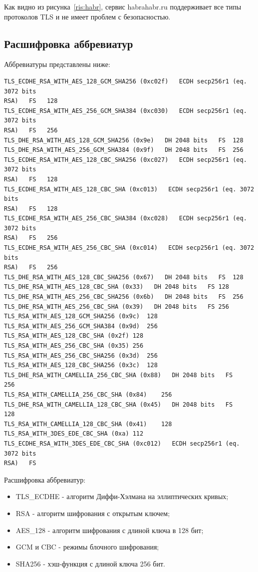 \documentclass[10pt,a4paper]{report}
\begin{document}
			Как видно из рисунка~\ref{ris:habr}, сервис habrahabr.ru поддерживает все 
			типы протоколов TLS и не имеет проблем с безопасностью.
			
		\subsection{Расшифровка аббревиатур}
			Аббревиатуры представлены ниже:
			\begin{lstlisting}
TLS_ECDHE_RSA_WITH_AES_128_GCM_SHA256 (0xc02f)   ECDH secp256r1 (eq. 3072 bits 
RSA)   FS	128
TLS_ECDHE_RSA_WITH_AES_256_GCM_SHA384 (0xc030)   ECDH secp256r1 (eq. 3072 bits 
RSA)   FS	256
TLS_DHE_RSA_WITH_AES_128_GCM_SHA256 (0x9e)   DH 2048 bits   FS	128
TLS_DHE_RSA_WITH_AES_256_GCM_SHA384 (0x9f)   DH 2048 bits   FS	256
TLS_ECDHE_RSA_WITH_AES_128_CBC_SHA256 (0xc027)   ECDH secp256r1 (eq. 3072 bits 
RSA)   FS	128
TLS_ECDHE_RSA_WITH_AES_128_CBC_SHA (0xc013)   ECDH secp256r1 (eq. 3072 bits 
RSA)   FS	128
TLS_ECDHE_RSA_WITH_AES_256_CBC_SHA384 (0xc028)   ECDH secp256r1 (eq. 3072 bits 
RSA)   FS	256
TLS_ECDHE_RSA_WITH_AES_256_CBC_SHA (0xc014)   ECDH secp256r1 (eq. 3072 bits 
RSA)   FS	256
TLS_DHE_RSA_WITH_AES_128_CBC_SHA256 (0x67)   DH 2048 bits   FS	128
TLS_DHE_RSA_WITH_AES_128_CBC_SHA (0x33)   DH 2048 bits   FS	128
TLS_DHE_RSA_WITH_AES_256_CBC_SHA256 (0x6b)   DH 2048 bits   FS	256
TLS_DHE_RSA_WITH_AES_256_CBC_SHA (0x39)   DH 2048 bits   FS	256
TLS_RSA_WITH_AES_128_GCM_SHA256 (0x9c)	128
TLS_RSA_WITH_AES_256_GCM_SHA384 (0x9d)	256
TLS_RSA_WITH_AES_128_CBC_SHA (0x2f)	128
TLS_RSA_WITH_AES_256_CBC_SHA (0x35)	256
TLS_RSA_WITH_AES_256_CBC_SHA256 (0x3d)	256
TLS_RSA_WITH_AES_128_CBC_SHA256 (0x3c)	128
TLS_DHE_RSA_WITH_CAMELLIA_256_CBC_SHA (0x88)   DH 2048 bits   FS	256
TLS_RSA_WITH_CAMELLIA_256_CBC_SHA (0x84)	256
TLS_DHE_RSA_WITH_CAMELLIA_128_CBC_SHA (0x45)   DH 2048 bits   FS	128
TLS_RSA_WITH_CAMELLIA_128_CBC_SHA (0x41)	128
TLS_RSA_WITH_3DES_EDE_CBC_SHA (0xa)	112
TLS_ECDHE_RSA_WITH_3DES_EDE_CBC_SHA (0xc012)   ECDH secp256r1 (eq. 3072 bits 
RSA)   FS
			\end{lstlisting}
			
			Расшифровка аббревиатур:
			\begin{itemize}
				\item TLS\_ECDHE - алгоритм Диффи-Хэлмана на эллиптических кривых;
				\item RSA - алгоритм шифрования с открытым ключем;
				\item AES\_128 - алгоритм шифрования с длиной ключа в 128 бит;
				\item GCM и CBC - режимы блочного шифрования;
				\item SHA256 - хэш-функция с длиной ключа 256 бит.
			\end{itemize}
			
\end{document}
